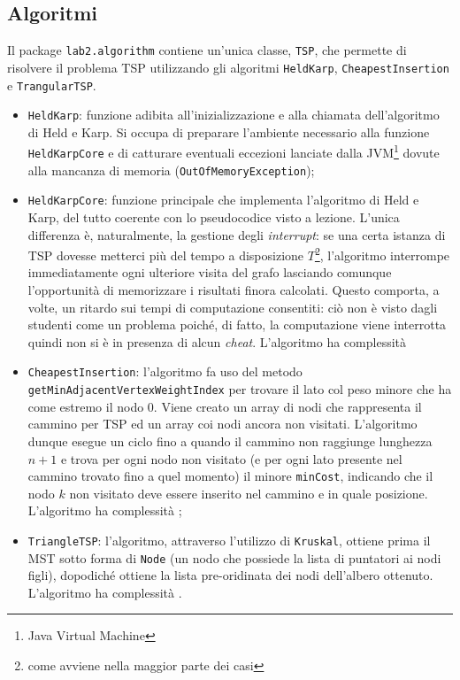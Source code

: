 \subsection{Algoritmi}
Il package \texttt{lab2.algorithm} contiene un'unica classe, \texttt{TSP}, che permette di risolvere il problema TSP utilizzando gli algoritmi \texttt{HeldKarp}, \texttt{CheapestInsertion} e \texttt{TrangularTSP}.
\begin{itemize}
	\item \texttt{HeldKarp}: funzione adibita all'inizializzazione e alla chiamata dell'algoritmo di Held e Karp. Si occupa di preparare l'ambiente necessario alla funzione \texttt{HeldKarpCore} e di catturare eventuali eccezioni lanciate dalla JVM\footnote{Java Virtual Machine} dovute alla mancanza di memoria (\texttt{OutOfMemoryException});
	\item \texttt{HeldKarpCore}: funzione principale che implementa l'algoritmo di Held e Karp, del tutto coerente con lo pseudocodice visto a lezione. L'unica differenza è, naturalmente, la gestione degli \textit{interrupt}: se una certa istanza di TSP dovesse metterci più del tempo a disposizione $T$\footnote{come avviene nella maggior parte dei casi}, l'algoritmo interrompe immediatamente ogni ulteriore visita del grafo lasciando comunque l'opportunità di memorizzare i risultati finora calcolati. Questo comporta, a volte, un ritardo sui tempi di computazione consentiti: ciò non è visto dagli studenti come un problema poiché, di fatto, la computazione viene interrotta quindi non si è in presenza di alcun \textit{cheat}. L'algoritmo ha complessità 
	\item \texttt{CheapestInsertion}: l'algoritmo fa uso del metodo \texttt{getMinAdjacentVertexWeightIndex} per trovare il lato col peso minore che ha come estremo il nodo 0. Viene creato un array di nodi che rappresenta il cammino per TSP ed un array coi nodi ancora non visitati. L'algoritmo dunque esegue un ciclo fino a quando il cammino non raggiunge lunghezza $n+1$ e trova per ogni nodo non visitato (e per ogni lato presente nel cammino trovato fino a quel momento) il minore \texttt{minCost}, indicando che il nodo $k$ non visitato deve essere inserito nel cammino e in quale posizione. L'algoritmo ha complessità ;
	\item \texttt{TriangleTSP}: l'algoritmo, attraverso l'utilizzo di \texttt{Kruskal}, ottiene prima il MST sotto forma di \texttt{Node} (un nodo che possiede la lista di puntatori ai nodi figli), dopodiché ottiene la lista pre-oridinata dei nodi dell'albero ottenuto. L'algoritmo ha complessità .
\end{itemize}


